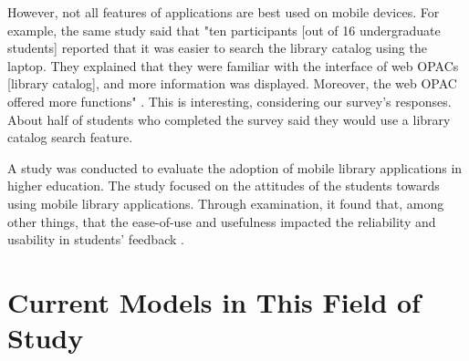     However, not all features of applications are best used on mobile devices. For example, the same study said that "ten participants [out of 16 undergraduate students] reported that it was easier to search the library catalog using the laptop. They explained that they were familiar with the interface of web OPACs [library catalog], and more information was displayed. Moreover, the web OPAC offered more functions" \cite{given_one}. This is interesting, considering our survey's responses. About half of students who completed the survey said they would use a library catalog search feature.
    
    A study was conducted to evaluate the adoption of mobile library applications in higher education. The study focused on the attitudes of the students towards using mobile library applications. Through examination, it found that, among other things, that the ease-of-use and usefulness impacted the reliability and usability in students' feedback \cite{Mobile_Apps_Between_Hong_Kong_and_Japan}.





\section{Current Models in This Field of Study}
